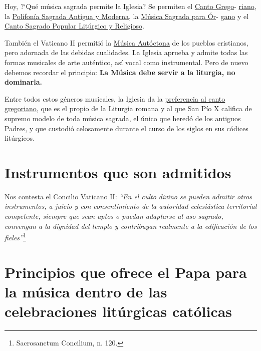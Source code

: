 \documentclass[letterpaper, 12pt]{book}
\begin{document}
    Hoy, ?`Qu\'e m\'usica sagrada permite la Iglesia? Se permiten el \underline{Canto Grego}- \underline{riano}, la \underline{Polifon\'ia Sagrada Antigua y Moderna}, la \underline{M\'usica Sagrada para \'Or}- \underline{gano} y el \underline{Canto Sagrado Popular Litúrgico y Religioso}.\newline
    
    Tambi\'en el Vaticano II permiti\'o la \underline{M\'usica Aut\'octona} de los pueblos cristianos, pero adornada de las debidas cualidades. La Iglesia aprueba y admite todas las formas musicales de arte aut\'entico, as\'i vocal como instrumental. Pero de nuevo debemos recordar el principio: \textbf{La M\'usica debe servir a la liturgia, no dominarla.}\newline
    
    Entre todos estos g\'eneros musicales, la Iglesia da la \underline{preferencia al canto} \underline{gregoriano}, que es el propio de la Liturgia romana y al que San P\'io X califica de supremo modelo de toda m\'usica sagrada, el \'unico que hered\'o de los antiguos Padres, y que custodi\'o celosamente durante el curso de los siglos en sus c\'odices lit\'urgicos.\newline
    
    \section{Instrumentos que son admitidos}
    Nos contesta el Concilio Vaticano II: \textit{``En el culto divino se pueden admitir otros instrumentos, a juicio y con consentimiento de la autoridad eclesi\'astica territorial competente, siempre que sean aptos o puedan adaptarse al uso sagrado, convengan a la dignidad del templo y contribuyan realmente a la edificaci\'on de los fieles''}\footnote{Sacrosanctum Concilium, n. 120.}\newline
    
    \section{Principios que ofrece el Papa para la m\'usica dentro de las celebraciones litúrgicas cat\'olicas}
    
\end{document}
